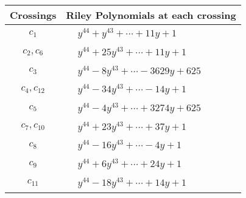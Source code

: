 \documentclass[1p]{elsarticle_modified}
\theoremstyle{definition}
\begin{document}
\begin{tabular}{m{50pt}|m{274pt}}
Crossings & \hspace{64pt}Riley Polynomials at each crossing \\
\hline $$\begin{aligned}c_{1}\end{aligned}$$&$\begin{aligned}
&y^{44}+y^{43}+\cdots+11 y+1
\end{aligned}$\\
\hline $$\begin{aligned}c_{2},c_{6}\end{aligned}$$&$\begin{aligned}
&y^{44}+25 y^{43}+\cdots+11 y+1
\end{aligned}$\\
\hline $$\begin{aligned}c_{3}\end{aligned}$$&$\begin{aligned}
&y^{44}-8 y^{43}+\cdots-3629 y+625
\end{aligned}$\\
\hline $$\begin{aligned}c_{4},c_{12}\end{aligned}$$&$\begin{aligned}
&y^{44}-34 y^{43}+\cdots-14 y+1
\end{aligned}$\\
\hline $$\begin{aligned}c_{5}\end{aligned}$$&$\begin{aligned}
&y^{44}-4 y^{43}+\cdots+3274 y+625
\end{aligned}$\\
\hline $$\begin{aligned}c_{7},c_{10}\end{aligned}$$&$\begin{aligned}
&y^{44}+23 y^{43}+\cdots+37 y+1
\end{aligned}$\\
\hline $$\begin{aligned}c_{8}\end{aligned}$$&$\begin{aligned}
&y^{44}-16 y^{43}+\cdots-4 y+1
\end{aligned}$\\
\hline $$\begin{aligned}c_{9}\end{aligned}$$&$\begin{aligned}
&y^{44}+6 y^{43}+\cdots+24 y+1
\end{aligned}$\\
\hline $$\begin{aligned}c_{11}\end{aligned}$$&$\begin{aligned}
&y^{44}-18 y^{43}+\cdots+14 y+1
\end{aligned}$\\
\hline
\end{tabular}\\~\\
\end{document}

